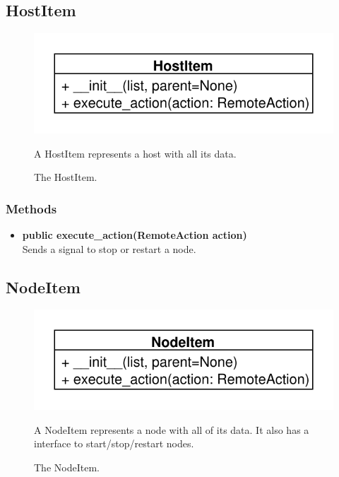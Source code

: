 \newpage
\subsection{HostItem}
\begin{figure}[htbp]
	\begin{minipage}[t]{7cm}
		\vspace{0pt}
		\centering
		\includegraphics[scale=0.6]{./diagram_pictures/HostItem.pdf}
		\caption{The HostItem.}
	\end{minipage}
	\hfill
	\begin{minipage}[t]{8cm}
		\vspace{10pt}		
		A HostItem represents a host with all its data.
	\end{minipage}
\end{figure}
\subsubsection{Methods}
\begin{itemize}
  \item \textbf{public execute\_action(RemoteAction action)}\\
  Sends a signal to stop or restart a node.
\end{itemize}

\subsection{NodeItem}
\begin{figure}[htbp]
	\begin{minipage}[t]{7cm}
		\vspace{0pt}
		\centering
		\includegraphics[scale=0.6]{./diagram_pictures/NodeItem.pdf}
		\caption{The NodeItem.}
	\end{minipage}
	\hfill
	\begin{minipage}[t]{8cm}
		\vspace{10pt}		
		A NodeItem represents a node with all of its data. It also has a interface to
		start/stop/restart nodes.
	\end{minipage}
\end{figure} 

